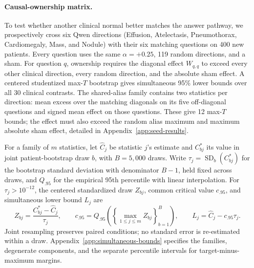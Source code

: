 \documentclass{article}
\begin{document}
\paragraph{Causal-ownership matrix.}
To test whether another clinical normal better matches the answer pathway, we prospectively cross six Qwen directions (Effusion, Atelectasis, Pneumothorax, Cardiomegaly, Mass, and Nodule) with their six matching questions on 400 new patients. Every question uses the same $\alpha=+0.25$, 119 random directions, and a sham. For question $q$, ownership requires the diagonal effect $W_{q,q}$ to exceed every other clinical direction, every random direction, and the absolute sham effect. A centered studentized max-$T$ bootstrap gives simultaneous 95\% lower bounds over all 30 clinical contrasts. The shared-alias family contains two statistics per direction: mean excess over the matching diagonals on its five off-diagonal questions and signed mean effect on those questions. These give 12 max-$T$ bounds; the effect must also exceed the random alias maximum and maximum absolute sham effect, detailed in Appendix~\ref{app:seed-results}.

For a family of $m$ statistics, let $\widehat C_j$ be statistic $j$'s estimate and $C^*_{bj}$ its value in joint patient-bootstrap draw $b$, with $B=5{,}000$ draws. Write $\tau_j=\operatorname{SD}_{b}(C^*_{bj})$ for the bootstrap standard deviation with denominator $B-1$, held fixed across draws, and $Q_{.95}$ for the empirical 95th percentile with linear interpolation. For $\tau_j>10^{-12}$, the centered standardized draw $Z_{bj}$, common critical value $c_{.95}$, and simultaneous lower bound $L_j$ are
\begin{equation}
Z_{bj}=\frac{C^*_{bj}-\widehat C_j}{\tau_j},\qquad
c_{.95}=Q_{.95}\!\left(\left\{\max_{1\leq j\leq m}Z_{bj}\right\}_{b=1}^{B}\right),\qquad
L_j=\widehat C_j-c_{.95}\tau_j.
\label{eq:max-t}
\end{equation}
Joint resampling preserves paired conditions; no standard error is re-estimated within a draw. Appendix~\ref{app:simultaneous-bounds} specifies the families, degenerate components, and the separate percentile intervals for target-minus-maximum margins.
\end{document}
